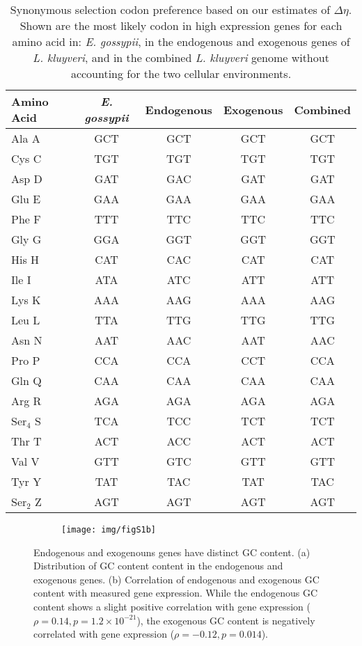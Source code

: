 \documentclass[doublespacing,linenumbers]{bmcart}
\newcommand{\kluyveri}{\textit{L. kluyveri}\xspace}
\newcommand{\gossypii}{\textit{E. gossypii}\xspace}
\newcommand{\GC}{GC content\xspace}
\newcommand{\DE}{\ensuremath{{\Delta \eta}}\xspace}
\begin{document}
\begin{backmatter}
\begin{table}
    \centering
    \caption{Synonymous selection codon preference based on our estimates of $\DE$.
	 Shown are the most likely codon in high expression genes for each amino acid in: \gossypii, in the endogenous and exogenous genes of \kluyveri, and in the combined \kluyveri genome without accounting for the two cellular environments.}
\begin{tabular}{  l  c  c  c  c  }
\hline
	Amino Acid & \gossypii & Endogenous & Exogenous & Combined \\ \hline
	Ala A & GCT & GCT & GCT & GCT \\ 
	Cys C & TGT & TGT & TGT & TGT \\ 
	Asp D & GAT & GAC & GAT & GAT \\ 
	Glu E & GAA & GAA & GAA & GAA \\ 
	Phe F & TTT & TTC & TTC & TTC \\ 
	Gly G & GGA & GGT & GGT & GGT \\ 
	His H & CAT & CAC & CAT & CAT \\ 
	Ile I & ATA & ATC & ATT & ATT \\ 
	Lys K & AAA & AAG & AAA & AAG \\ 
	Leu L & TTA & TTG & TTG & TTG \\ 
	Asn N & AAT & AAC & AAT & AAC \\ 
	Pro P & CCA & CCA & CCT & CCA \\ 
	Gln Q & CAA & CAA & CAA & CAA \\ 
	Arg R & AGA & AGA & AGA & AGA \\ 
	Ser$_4$ S & TCA & TCC & TCT & TCT \\ 
	Thr T & ACT & ACC & ACT & ACT \\ 
	Val V & GTT & GTC & GTT & GTT \\ 
	Tyr Y & TAT & TAC & TAT & TAC \\ 
	Ser$_2$ Z & AGT & AGT & AGT & AGT \\ \hline
\end{tabular}
    \label{tab:codon_pref_deta}
\end{table}
\clearpage

\begin{figure}
    \centering
    \begin{subfigure}
        \centering
    \end{subfigure}
    \begin{subfigure}
        \centering
        \texttt{[image: img/figS1b]}
    \end{subfigure}
    \caption{Endogenous and exogenouns genes have distinct \GC. 
    (a) Distribution of \GC content in the endogenous and exogenous genes.
    (b) Correlation of endogenous and exogenous \GC with measured gene expression. 
    While the endogenous \GC shows a slight positive correlation with gene expression ($\rho = 0.14, p = 1.2\times10^{-21}$), the exogenous \GC is negatively correlated with gene expression ($\rho = -0.12, p = 0.014$).}
    \label{fig:gc_comp_phi}
\end{figure}
\null
\vfill
\clearpage



\end{backmatter}
\end{document}
